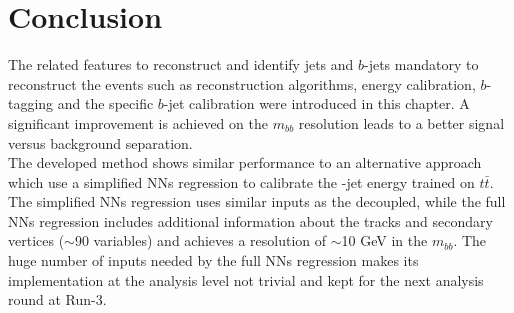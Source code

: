 \section{Conclusion}
\label{Jet:Conc}
The related features to reconstruct and identify jets and $b$-jets mandatory to reconstruct the \HHyybb events such as reconstruction algorithms, energy calibration, $b$-tagging and the specific $b$-jet calibration were introduced in this chapter. A significant improvement is achieved on the $m_{bb}$ resolution leads to a better signal versus background separation.\\
The developed method shows similar performance to an alternative approach which use a simplified NNs regression to calibrate the \bq-jet energy trained on $t\bar{t}$. The simplified NNs regression uses similar inputs as the decoupled, while the full NNs regression includes additional information about the tracks and secondary vertices ($\sim$90 variables) and achieves a resolution of $\sim$10 GeV in the $m_{bb}$. The huge number of inputs needed by the full NNs regression makes its implementation at the analysis level not trivial and kept for the next analysis round at Run-3.